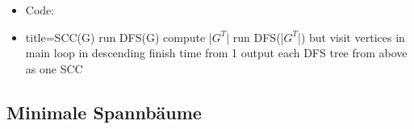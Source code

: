 \documentclass[
    12pt,
    a4paper,
    ngerman,
    color=3b,%
    marginpar=false,
    colorback=false,
    leqno,
]{tudaexercise}
\begin{document}
\begin{itemize}
\begin{itemize}
\begin{itemize}
                        \item Code:
                        \item[]
                            \begin{ccode}[autogobble,escapeinside=||]{title={SCC(G)}}
                            run DFS(G)
                            compute |$G^T$|
                            run DFS(|$G^T$|) but visit vertices in main loop
                                in descending finish time from 1
                            output each DFS tree from above as one SCC
                            \end{ccode}
                    \end{itemize}
            \end{itemize}
    \end{itemize}
\clearpage
\subsection{Minimale Spannbäume}
\end{document}
